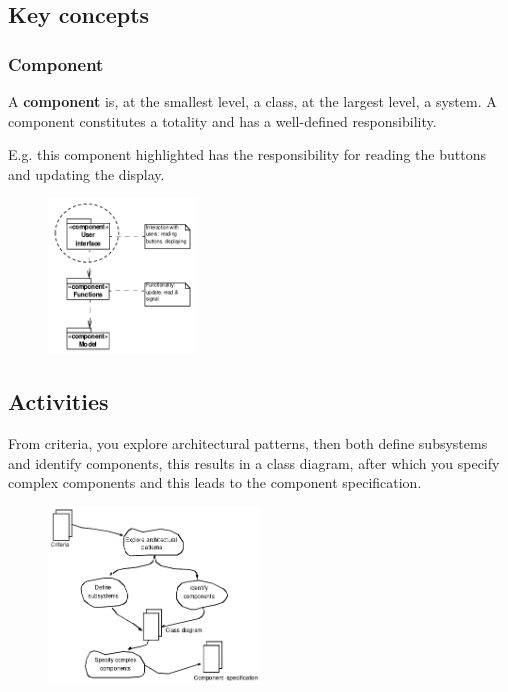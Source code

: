 \subsection{Key concepts}
\subsubsection{Component}
A \textbf{component} is, at the smallest level, a class, at the largest level, a system. A component constitutes a totality and has a well-defined responsibility.

E.g. this component highlighted has the responsibility for reading the buttons and updating the display. 

\begin{figure}[H]
    \centering
    \includegraphics[width=0.35\textwidth]{figures/componentexample.png}
\end{figure}

\subsection{Activities}
From criteria, you explore architectural patterns, then both define subsystems and identify components, this results in a class diagram, after which you specify complex components and this leads to the component specification.

\begin{figure}[H]
    \centering
    \includegraphics[width=0.5\textwidth]{figures/componentsactivities.png}
\end{figure}

